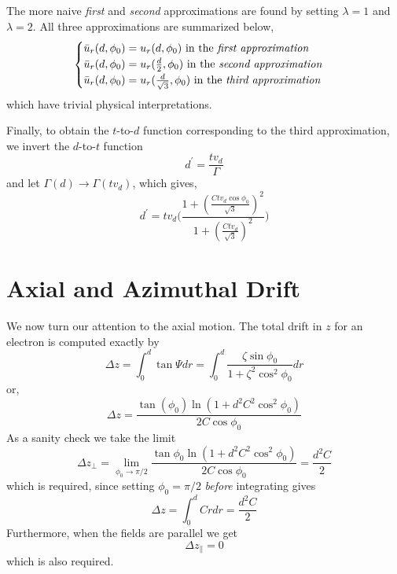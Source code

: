 \documentclass[twoside]{article}
\begin{document}
\begin{multicols}{2}
The more naive \emph{first} and \emph{second} approximations are found by setting $\lambda = 1$ and $\lambda = 2$. All three approximations are summarized below, 
\begin{equation}
 \begin{cases}
               \bar{u}_r(d,\phi_0) = u_r(d,\phi_0) \text{  in the \emph{first approximation}}\\
               \bar{u}_r(d,\phi_0) = u_r(\frac{d}{2},\phi_0) \text{  in the \emph{second approximation}} \\
               \bar{u}_r(d,\phi_0) = u_r(\frac{d}{\sqrt{3}},\phi_0) \text{  in the \emph{third approximation}}
            \end{cases} 
\end{equation}
which have trivial physical interpretations.


Finally, to obtain the $t$-to-$d$ function corresponding to the third approximation, we invert the $d$-to-$t$ function
 \begin{equation}
d^\prime = \frac{t v_d}{ \Gamma}
 \end{equation}
and let $\Gamma(d) \to \Gamma(t v_d)$, which gives,
 \begin{equation}
 \boxed{
 d^\prime = t v_d \bigg(\frac{1 + (\frac{C t v_d  \cos \phi_0}{\sqrt{3}})^2}{1 + (\frac{C t v_d}{\sqrt{3}})^2}\bigg)
 }
 \end{equation}






\section{Axial and Azimuthal Drift}
We now turn our attention to the axial motion. The total drift in $z$ for an electron is computed exactly by
\begin{equation}
\Delta z = \int^d_0 \tan \Psi dr = \int^d_0  \frac{\zeta \sin \phi_0}{1 + \zeta^2 \cos^2 \phi_0} dr
\end{equation}
or,
\begin{equation}
\boxed{
\Delta z = \frac{\tan(\phi_0) \ln(1 + d^2 C^2 \cos^2\phi_0 ) }{2 C \cos\phi_0}
}
\end{equation}
As a sanity check we take the limit
\begin{equation}
\Delta z_\perp =  \lim_{\phi_0\to \pi/2} \frac{\tan\phi_0 \ln(1 + d^2 C^2 \cos^2\phi_0 ) }{2 C \cos\phi_0} = \frac{d^2 C}{2}
\end{equation}
which is required, since setting $\phi_0 = \pi/2$ \emph{before} integrating gives
\begin{equation}
\Delta z = \int^d_0 C r dr = \frac{d^2 C}{2}
\end{equation}
Furthermore, when the fields are parallel we get
\begin{equation}
\Delta z_\parallel = 0
\end{equation}
which is also required.




\end{multicols}
\end{document}
